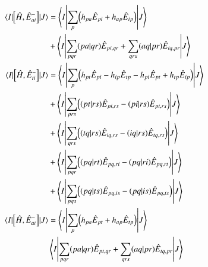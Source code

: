 \documentclass[aip,jcp,reprint,noshowkeys,superscriptaddress]{revtex4-1}
\begin{document}
\begin{align}
  \label{eq:commHamExcOp}
\mel{I}{\comm{\hH}{\hE_{ai}^-}}{J} &= \mel**{I}{\sum_p \mleft(h_{pa}\hE_{pi} + h_{ap}\hE_{ip}\mright)}{J} \\
  &+ \mel**{I}{\sum_{pqr}\ceri{pa}{qr}\hE_{pi,qr} + \sum_{qrs}\ceri{aq}{pr}\hE_{iq,pr}}{J} \notag \\
  \mel{I}{\comm{\hH}{\hE_{ti}^-}}{J}&= \mel**{I}{\sum_p \mleft(h_{pt}\hE_{pi} - h_{ip}\hE_{tp} - h_{pi}\hE_{pt} + h_{tp}\hE_{ip}\mright)}{J} \notag \\
                                     &+ \mel**{I}{\sum_{prs}\mleft(\ceri{pt}{rs}\hE_{pi,rs} - \ceri{pi}{rs}\hE_{pt,rs} \mright)}{J} \notag \\
  &+ \mel**{I}{\sum_{qrs}\mleft(\ceri{tq}{rs}\hE_{iq,rs} - \ceri{iq}{rs}\hE_{tq,rs} \mright)}{J}   \\
                                     &+ \mel**{I}{\sum_{pqr}\mleft(\ceri{pq}{rt}\hE_{pq,ri} - \ceri{pq}{ri}\hE_{pq,rt} \mright)}{J} \notag \\
  &+ \mel**{I}{\sum_{pqs}\mleft(\ceri{pq}{ts}\hE_{pq,is} - \ceri{pq}{is}\hE_{pq,ts} \mright) }{J} \notag \\
  \mel{I}{\comm{\hH}{\hE_{at}^-}}{J} &= \mel**{I}{\sum_p \mleft(h_{pa}\hE_{pt} + h_{ap}\hE_{tp}\mright) }{J} \\
  & \mel**{I}{\sum_{pqr}\ceri{pa}{qr}\hE_{pt,qr} + \sum_{qrs}\ceri{aq}{pr}\hE_{tq,pr}}{J} \notag
\end{align}


\end{document}
